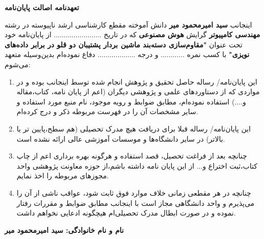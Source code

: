 \thispagestyle{empty}
\noindent

\textbf{\Large تعهدنامه اصالت  پایان‌نامه}
\vskip 1cm

اینجانب \textbf{سید امیرمحمود میر} دانش آموخته مقطع کارشناسی ارشد ناپیوسته در رشته \textbf{مهندسی کامپیوتر} گرایش \textbf{هوش مصنوعی} که در تاریخ ........................ از پایان‌نامه خود تحت عنوان \textbf{"مقاوم‌سازی دسته‌بند ماشین بردار پشتیبان دو قلو در برابر داده‌های نویزی"} با کسب نمره ............ و درجه ................... دفاع نموده‌ام بدین‌وسیله متعهد می‌شوم:
\begin{enumerate}
	\item این پایان‌نامه/ رساله حاصل تحقیق و پژوهش انجام شده توسط اینجانب بوده و در مواردی که از دستاوردهای علمی و پژوهشی دیگران (اعم از پایان نامه، کتاب،مقاله و....) استفاده نموده‌ام، مطابق ضوابط و رویه موجود، نام منبع مورد استفاده و سایر مشخصات آن را در فهرست مربوطه ذکر و درج کرده‌ام.
	\item این پایان‌نامه/ رساله قبلا برای دریافت هیچ مدرک تحصیلی (هم سطح،پایین تر یا بالاتر) در سایر دانشگاه‌ها و موسسات آموزشی عالی ارائه نشده است.
	\item 	چنانچه بعد از فراغت تحصیل، قصد استفاده و هرگونه بهره برداری اعم از چاپ کتاب،ثبت اختراع و... از این پایان نامه داشته باشم،از حوزه معاونت پژوهشی واحد مجوزهای مربوطه را اخذ نمایم.
	\item 	چنانچه در هر مقطعی زمانی خلاف موارد فوق ثابت شود، عواقب ناشی از آن را می‌پذیرم و واحد دانشگاهی مجاز است با اینجانب مطابق ضوابط و مقررات رفتار نموده و در صورت ابطال مدرک تحصیلی‌ام هیچگونه ادعایی نخواهم داشت.
\end{enumerate}

\vskip 0.5cm
\begin{flushleft}
\textbf{نام و نام خانوادگی: سید امیرمحمود میر}
\end{flushleft}